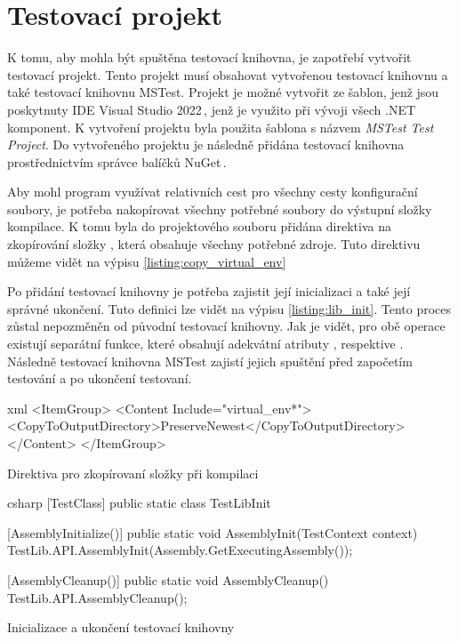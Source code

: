 \section{Testovací projekt}

K tomu, aby mohla být spuštěna testovací knihovna, je zapotřebí vytvořit testovací projekt. Tento projekt musí obsahovat vytvořenou testovací knihovnu a také testovací knihovnu MSTest. Projekt je možné vytvořit ze šablon, jenž jsou poskytnuty IDE Visual Studio 2022\,\cite{vs2022}, jenž je využito při vývoji všech .NET komponent. K vytvoření projektu byla použita šablona s názvem \textit{MSTest Test Project}. Do vytvořeného projektu je následně přidána testovací knihovna prostřednictvím správce balíčků NuGet\,\cite{nuget}. 

Aby mohl program využívat relativních cest pro všechny cesty konfigurační soubory, je potřeba nakopírovat všechny potřebné soubory do výstupní složky kompilace. K tomu byla do projektového souboru přidána direktiva na zkopírování složky , která obsahuje všechny potřebné zdroje. Tuto direktivu můžeme vidět na výpisu \ref{listing:copy_virtual_env}

Po přidání testovací knihovny je potřeba zajistit její inicializaci a také její správné ukončení. Tuto definici lze vidět na výpisu \ref{listing:lib_init}. Tento proces zůstal nepozměněn od původní testovací knihovny. Jak je vidět, pro obě operace existují separátní funkce, které obsahují adekvátní atributy , respektive . Následně testovací knihovna MSTest zajistí jejich spuštění před započetím testování a po ukončení testovaní.  

\begin{listing}[htbp]
    \centering
    \begin{cminted}[breaklines,autogobble, fontsize=\footnotesize]{xml}
<ItemGroup>
    <Content Include="virtual_env\**">
        <CopyToOutputDirectory>PreserveNewest</CopyToOutputDirectory>
    </Content>
</ItemGroup>
    \end{cminted}
\caption{Direktiva pro zkopírovaní složky při kompilaci}
\label{listing:copy_virtual_env}
\end{listing}

\begin{listing}[htbp]
    \centering
    \begin{cminted}[breaklines,autogobble, fontsize=\small]{csharp}
[TestClass]
public static class TestLibInit
{
    [AssemblyInitialize()]
    public static void AssemblyInit(TestContext context)
    {
        TestLib.API.AssemblyInit(Assembly.GetExecutingAssembly());
    }

    [AssemblyCleanup()]
    public static void AssemblyCleanup()
    {
        TestLib.API.AssemblyCleanup();
    }
}
    \end{cminted}
\caption{Inicializace a ukončení testovací knihovny}
\label{listing:lib_init}
\end{listing}

